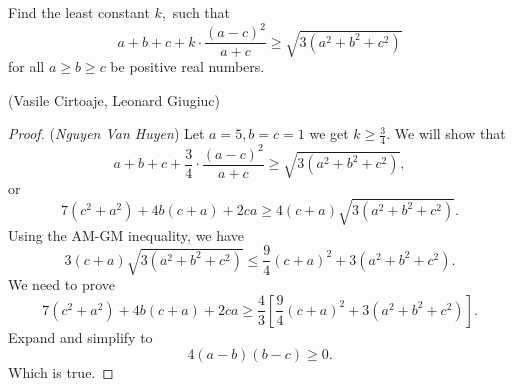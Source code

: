 \documentclass[12pt,a4paper]{book}
\begin{document}
\begin{pro_no_count}
Find the least constant $k,$ such that
$$a+b+c+k\cdot\frac{(a-c)^2}{a+c}\geq \sqrt{3(a^2+b^2+c^2)}$$
for all $a\ge b\ge c$ be positive real numbers.
\begin{flushright}(Vasile Cirtoaje, Leonard Giugiuc)\end{flushright}
\end{pro_no_count}

\begin{proof} (\textit{Nguyen Van Huyen}) Let $a=5,b=c=1$ we get $k \geqslant \frac34.$ We will show that
$$a+b+c+\frac34\cdot\frac{\left(a-c\right)^2}{a+c}\geq\sqrt{3\left(a^2+b^2+c^2\right)},$$
or
\[7(c^2+a^2)+4b(c+a)+2ca \geqslant 4(c+a)\sqrt{3(a^2+b^2+c^2)}.\]
Using the AM-GM inequality, we have
\[3(c+a)\sqrt{3(a^2+b^2+c^2)} \leqslant \frac94(c+a)^2+3(a^2+b^2+c^2).\]
We need to prove
\[7(c^2+a^2)+4b(c+a)+2ca \geqslant \frac{4}{3}\left[\frac94(c+a)^2+3(a^2+b^2+c^2)\right].\]
Expand and simplify to
\[4(a-b)(b-c) \geqslant 0.\]
Which is true.
\end{proof}
\end{document}
